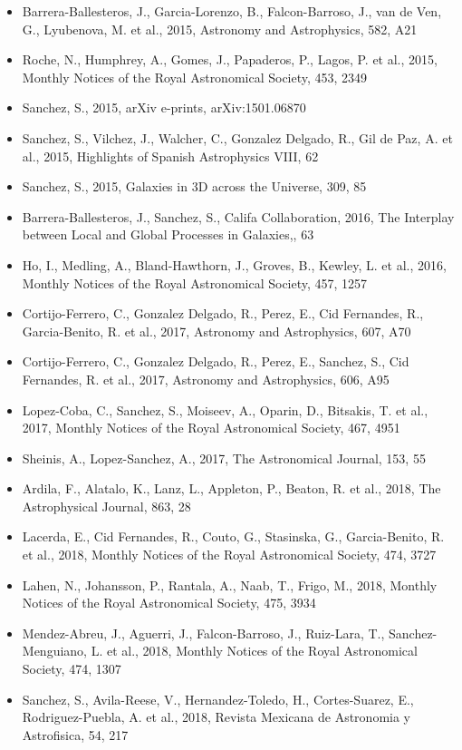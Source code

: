 \documentclass{letter}
\begin{document}
\begin{enumerate}
\begin{itemize}
\item Barrera-Ballesteros, J., Garcia-Lorenzo, B., Falcon-Barroso, J., van de Ven, G., Lyubenova, M. et al., 2015, Astronomy and Astrophysics, 582, A21
\item Roche, N., Humphrey, A., Gomes, J., Papaderos, P., Lagos, P. et al., 2015, Monthly Notices of the Royal Astronomical Society, 453, 2349
\item Sanchez, S., 2015, arXiv e-prints, arXiv:1501.06870
\item Sanchez, S., Vilchez, J., Walcher, C., Gonzalez Delgado, R., Gil de Paz, A. et al., 2015, Highlights of Spanish Astrophysics VIII, 62
\item Sanchez, S., 2015, Galaxies in 3D across the Universe, 309, 85
\item Barrera-Ballesteros, J., Sanchez, S., Califa Collaboration, 2016, The Interplay between Local and Global Processes in Galaxies,, 63
\item Ho, I., Medling, A., Bland-Hawthorn, J., Groves, B., Kewley, L. et al., 2016, Monthly Notices of the Royal Astronomical Society, 457, 1257
\item Cortijo-Ferrero, C., Gonzalez Delgado, R., Perez, E., Cid Fernandes, R., Garcia-Benito, R. et al., 2017, Astronomy and Astrophysics, 607, A70
\item Cortijo-Ferrero, C., Gonzalez Delgado, R., Perez, E., Sanchez, S., Cid Fernandes, R. et al., 2017, Astronomy and Astrophysics, 606, A95
\item Lopez-Coba, C., Sanchez, S., Moiseev, A., Oparin, D., Bitsakis, T. et al., 2017, Monthly Notices of the Royal Astronomical Society, 467, 4951
\item Sheinis, A., Lopez-Sanchez, A., 2017, The Astronomical Journal, 153, 55
\item Ardila, F., Alatalo, K., Lanz, L., Appleton, P., Beaton, R. et al., 2018, The Astrophysical Journal, 863, 28
\item Lacerda, E., Cid Fernandes, R., Couto, G., Stasinska, G., Garcia-Benito, R. et al., 2018, Monthly Notices of the Royal Astronomical Society, 474, 3727
\item Lahen, N., Johansson, P., Rantala, A., Naab, T., Frigo, M., 2018, Monthly Notices of the Royal Astronomical Society, 475, 3934
\item Mendez-Abreu, J., Aguerri, J., Falcon-Barroso, J., Ruiz-Lara, T., Sanchez-Menguiano, L. et al., 2018, Monthly Notices of the Royal Astronomical Society, 474, 1307
\item Sanchez, S., Avila-Reese, V., Hernandez-Toledo, H., Cortes-Suarez, E., Rodriguez-Puebla, A. et al., 2018, Revista Mexicana de Astronomia y Astrofisica, 54, 217

\end{itemize}
\end{enumerate}
\end{document}
